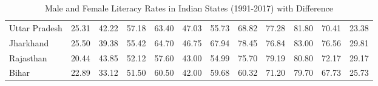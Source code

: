 \begin{table}[h]
\begin{tabular}{lccccccccccc}
        Uttar Pradesh   & 25.31 & 42.22 & 57.18 & 63.40 & 47.03 & 55.73 & 68.82 & 77.28 & 81.80 & 70.41 & 23.38 \\
        Jharkhand       & 25.50 & 39.38 & 55.42 & 64.70 & 46.75 & 67.94 & 78.45 & 76.84 & 83.00 & 76.56 & 29.81 \\
        Rajasthan       & 20.44 & 43.85 & 52.12 & 57.60 & 43.00 & 54.99 & 75.70 & 79.19 & 80.80 & 72.17 & 29.17 \\
        Bihar           & 22.89 & 33.12 & 51.50 & 60.50 & 42.00 & 59.68 & 60.32 & 71.20 & 79.70 & 67.73 & 25.73 \\
        \bottomrule
    \end{tabular}
    \caption{Male and Female Literacy Rates in Indian States (1991-2017) with Difference}
    \label{tab:combined_literacy_states_diff}
\end{table}

